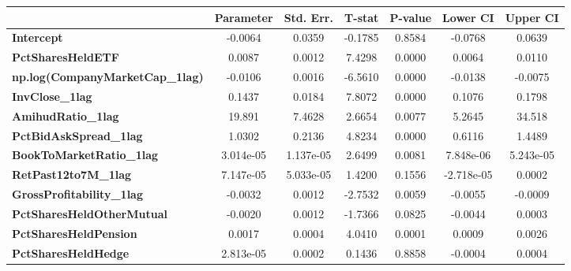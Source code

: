 \begin{center}
\begin{tabular}{lclc}
\bottomrule
\end{tabular}
\begin{tabular}{lcccccc}
                                        & \textbf{Parameter} & \textbf{Std. Err.} & \textbf{T-stat} & \textbf{P-value} & \textbf{Lower CI} & \textbf{Upper CI}  \\
\midrule
\textbf{Intercept}                      &      -0.0064       &       0.0359       &     -0.1785     &      0.8584      &      -0.0768      &       0.0639       \\
\textbf{PctSharesHeldETF}               &       0.0087       &       0.0012       &      7.4298     &      0.0000      &       0.0064      &       0.0110       \\
\textbf{np.log(CompanyMarketCap\_1lag)} &      -0.0106       &       0.0016       &     -6.5610     &      0.0000      &      -0.0138      &      -0.0075       \\
\textbf{InvClose\_1lag}                 &       0.1437       &       0.0184       &      7.8072     &      0.0000      &       0.1076      &       0.1798       \\
\textbf{AmihudRatio\_1lag}              &       19.891       &       7.4628       &      2.6654     &      0.0077      &       5.2645      &       34.518       \\
\textbf{PctBidAskSpread\_1lag}          &       1.0302       &       0.2136       &      4.8234     &      0.0000      &       0.6116      &       1.4489       \\
\textbf{BookToMarketRatio\_1lag}        &     3.014e-05      &     1.137e-05      &      2.6499     &      0.0081      &     7.848e-06     &     5.243e-05      \\
\textbf{RetPast12to7M\_1lag}            &     7.147e-05      &     5.033e-05      &      1.4200     &      0.1556      &     -2.718e-05    &       0.0002       \\
\textbf{GrossProfitability\_1lag}       &      -0.0032       &       0.0012       &     -2.7532     &      0.0059      &      -0.0055      &      -0.0009       \\
\textbf{PctSharesHeldOtherMutual}       &      -0.0020       &       0.0012       &     -1.7366     &      0.0825      &      -0.0044      &       0.0003       \\
\textbf{PctSharesHeldPension}           &       0.0017       &       0.0004       &      4.0410     &      0.0001      &       0.0009      &       0.0026       \\
\textbf{PctSharesHeldHedge}             &     2.813e-05      &       0.0002       &      0.1436     &      0.8858      &      -0.0004      &       0.0004       \\

\end{tabular}
\end{center}
